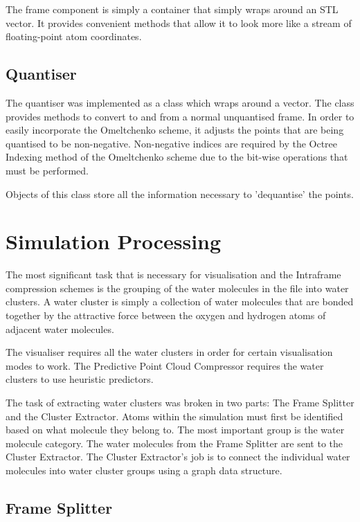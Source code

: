 \documentclass[a4paper,11pt]{report}
\begin{document}
The frame component is simply a container that simply wraps around an STL vector. It provides convenient methods that allow it to look more like a stream of floating-point atom coordinates.

\subsection{Quantiser}

The quantiser was implemented as a class which wraps around a vector. The class provides methods to convert to and from a normal unquantised frame. In order to easily incorporate the Omeltchenko scheme, it adjusts the points that are being quantised to be non-negative. Non-negative indices are required by the Octree Indexing method of the Omeltchenko scheme due to the bit-wise operations that must be performed.

Objects of this class store all the information necessary to 'dequantise' the points.

\section{Simulation Processing}

The most significant task that is necessary for visualisation and the Intraframe compression schemes is the grouping of the water molecules in the file into water clusters. A water cluster is simply a collection of water molecules that are bonded together by the attractive force between the oxygen and hydrogen atoms of adjacent water molecules. 

The visualiser requires all the water clusters in order for certain visualisation modes to work. The Predictive Point Cloud Compressor requires the water clusters to use heuristic predictors. 

The task of extracting water clusters was broken in two parts: The Frame Splitter and the Cluster Extractor. Atoms within the simulation must first be identified based on what molecule they belong to. The most important group is the water molecule category. The water molecules from the Frame Splitter are sent to the Cluster Extractor. The Cluster Extractor's job is to connect the individual water molecules into water cluster groups using a graph data structure.

\subsection{Frame Splitter}
\end{document}
